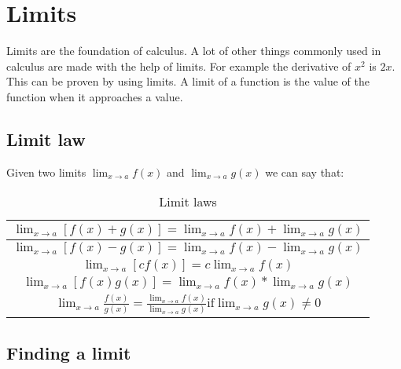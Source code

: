 \section{Limits}
Limits are the foundation of calculus.
A lot of other things commonly used in calculus are made with the help of limits.
For example the derivative of \(x^2\) is \(2x\).
This can be proven by using limits.
A limit of a function is the value of the function when it approaches a value.

\subsection{Limit law}

Given two limits \(\lim_{x \to a} f(x)\) and \(\lim_{x \to a} g(x)\) we can say that:

\begin{table}[h]
	\centering
	\begin{tabular} {c}
    \(\lim_{x \to a} [f(x) + g(x)] = \lim_{x \to a} f(x) + \lim_{x \to a} g(x)\) \\\hline
    \(\lim_{x \to a} [f(x) - g(x)] = \lim_{x \to a} f(x) - \lim_{x \to a} g(x)\) \\\hline
    \(\lim_{x \to a} [c f(x)] = c \lim_{x \to a} f(x)\) \\\hline
    \(\lim_{x \to a} [f(x)g(x)] = \lim_{x \to a} f(x) * \lim_{x \to a} g(x)\) \\\hline
    \(\lim_{x \to a} \frac{f(x)}{g(x)} = \frac{\lim_{x \to a} f(x)}{\lim_{x \to a} g(x)} \text{if} \lim_{x \to a} g(x) \neq 0\) \\
	\end{tabular}
	\caption{Limit laws}
\end{table}

\subsection{Finding a limit}
\begin{figure}[H]
  \begin{center}
  \end{center}
\end{figure}

